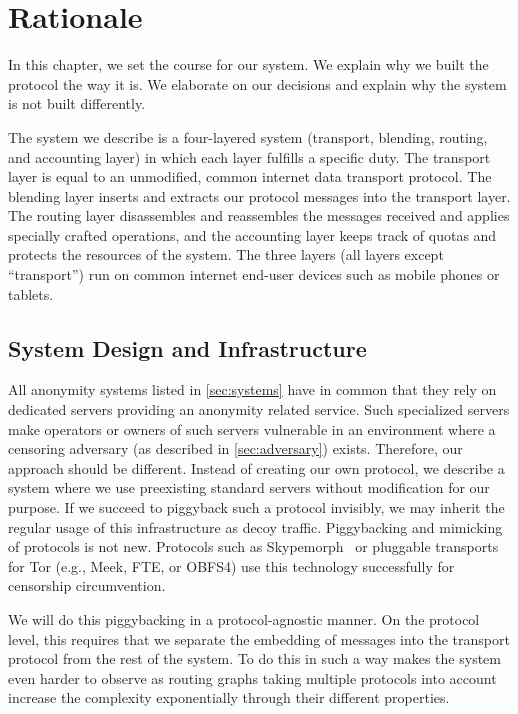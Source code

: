 \chapter{Rationale}\label{sec:rationale}
In this chapter, we set the course for our system. We explain why we built the protocol the way it is. We elaborate on our decisions and explain why the system is not built differently.

The system we describe is a four-layered system (transport, blending, routing, and accounting layer) in which each layer fulfills a specific duty. The transport layer is equal to an unmodified, common internet data transport protocol. The blending layer inserts and extracts our protocol messages into the transport layer. The routing layer disassembles and reassembles the messages received and applies specially crafted operations, and the accounting layer keeps track of quotas and protects the resources of the system. The three \MessageVortex{} layers (all layers except ``transport'') run on common internet end-user devices such as mobile phones or tablets.

\section{System Design and Infrastructure}
All anonymity systems listed in \cref{sec:systems} have in common that they rely on dedicated servers providing an anonymity related service. Such specialized servers make operators or owners of such servers vulnerable in an environment where a censoring adversary (as described in \cref{sec:adversary}) exists. Therefore, our approach should be different. Instead of creating our own protocol, we describe a system where we use preexisting standard servers without modification for our purpose. If we succeed to piggyback such a protocol invisibly, we may inherit the regular usage of this infrastructure as decoy traffic. Piggybacking and mimicking of protocols is not new. Protocols such as Skypemorph~\cite{mohajeri2012skypemorph} or pluggable transports for Tor (e.g., Meek, FTE, or OBFS4) use this technology successfully for censorship circumvention.

We will do this piggybacking in a protocol-agnostic manner. On the protocol level, this requires that we separate the embedding of messages into the transport protocol from the rest of the system. To do this in such a way makes the system even harder to observe as routing graphs taking multiple protocols into account increase the complexity exponentially through their different properties.

